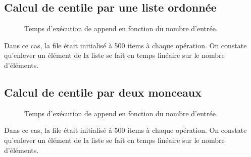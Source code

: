 \documentclass[french]{article}
\begin{document}
\subsection{Calcul de centile par une liste ordonnée}
\begin{figure}
\caption{Temps d'exécution de \textsf{append} en fonction du nombre d'entrée.}
\end{figure}
Dans ce cas, la file était initialisé à 500 items à chaque opération. On
constate qu'enlever un élément de la liste se fait en temps linéaire sur le
nombre d'éléments.

\subsection{Calcul de centile par deux monceaux}
\begin{figure}
\caption{Temps d'exécution de \textsf{append} en fonction du nombre d'entrée.}
\end{figure}
Dans ce cas, la file était initialisé à 500 items à chaque opération. On
constate qu'enlever un élément de la liste se fait en temps linéaire sur le
nombre d'éléments.
\end{document}
